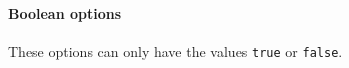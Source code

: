 \documentclass[%
  type=article,%
  layout=koma,%
  page=false,%
  hyperref=true,%
  cleveref=true,%
  conditionallox=true,%
  conditionalloxnewpage=true,%
  date=true,%
  glossaries=true,%
  index=true,%
  listings=true%
]{stmtext}
\newcommand{\stmlatexpackagelink}[1]{\href{https://github.com/raedma/stmlatex/blob/master/doc/#1/#1.pdf}{\texttt{#1}}}
\begin{document}

\paragraph{Boolean options}

These options can only have the values \texttt{true} or \texttt{false}.

\end{document}
